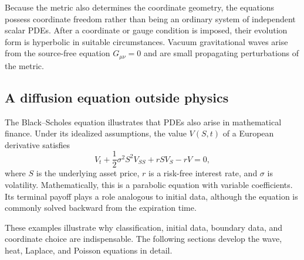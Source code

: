 Because the metric also determines the coordinate geometry, the equations possess coordinate freedom rather than being an ordinary system of independent scalar PDEs. After a coordinate or gauge condition is imposed, their evolution form is hyperbolic in suitable circumstances. Vacuum gravitational waves arise from the source-free equation $G_{\mu\nu}=0$ and are small propagating perturbations of the metric.

\subsection{A diffusion equation outside physics}

The Black--Scholes equation illustrates that PDEs also arise in mathematical finance. Under its idealized assumptions, the value $V(S,t)$ of a European derivative satisfies
\begin{equation}
V_t+\frac12\sigma^2S^2V_{SS}+rS V_S-rV=0,
\end{equation}
where $S$ is the underlying asset price, $r$ is a risk-free interest rate, and $\sigma$ is volatility. Mathematically, this is a parabolic equation with variable coefficients. Its terminal payoff plays a role analogous to initial data, although the equation is commonly solved backward from the expiration time.

These examples illustrate why classification, initial data, boundary data, and coordinate choice are indispensable. The following sections develop the wave, heat, Laplace, and Poisson equations in detail.